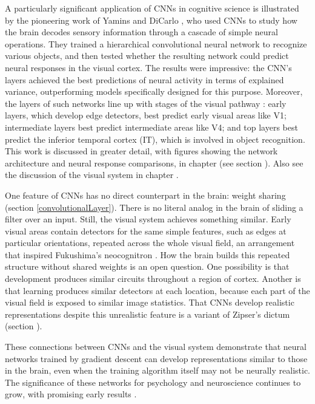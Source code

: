 A particularly significant application of CNNs in cognitive science is illustrated by the pioneering work of Yamins and DiCarlo \cite{yamins2016using}, who used CNNs to study how the brain decodes sensory information through a cascade of simple neural operations. They trained a hierarchical convolutional neural network to recognize various objects, and then tested whether the resulting network could predict neural responses in the visual cortex. The results were impressive: the CNN's layers achieved the best predictions of neural activity in terms of explained variance, outperforming models specifically designed for this purpose. Moreover, the layers of such networks line up with stages of the visual pathway \cite{gucclu2015deep}: early layers, which develop edge detectors, best predict early visual areas like V1; intermediate layers best predict intermediate areas like V4; and top layers best predict the inferior temporal cortex (IT), which is involved in object recognition. This work is discussed in greater detail, with figures showing the network architecture and neural response comparisons, in chapter  (see section ). Also see the discussion of the visual system in chapter .

One feature of CNNs has no direct counterpart in the brain: weight sharing (section \ref{convolutionalLayer}). There is no literal analog in the brain of sliding a filter over an input. Still, the visual system achieves something similar. Early visual areas contain detectors for the same simple features, such as edges at particular orientations, repeated across the whole visual field, an arrangement that inspired Fukushima's neocognitron \cite{fukushima1982neocognitron}. How the brain builds this repeated structure without shared weights is an open question. One possibility is that development produces similar circuits throughout a region of cortex. Another is that learning produces similar detectors at each location, because each part of the visual field is exposed to similar image statistics.
That CNNs develop realistic representations despite this unrealistic feature is a variant of Zipser's dictum (section ).


These connections between CNNs and the visual system demonstrate that neural networks trained by gradient descent can develop representations similar to those in the brain, even when the training algorithm itself may not be neurally realistic. The significance of these networks for psychology and neuroscience continues to grow, with promising early results \cite{zorzi2013modeling, ritter2017cognitive}.

